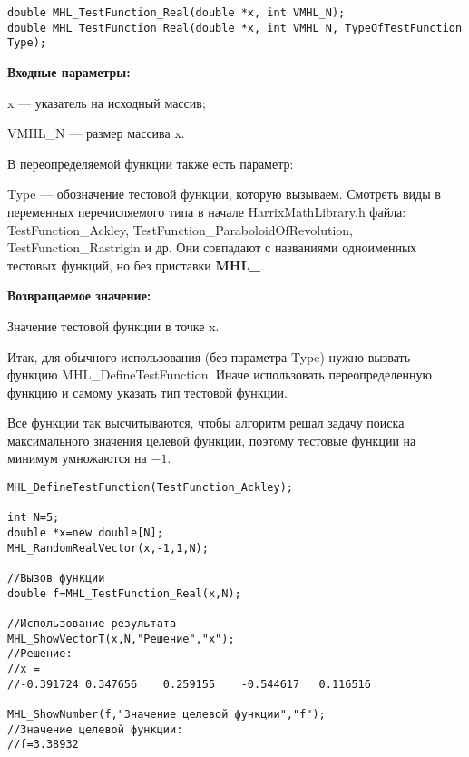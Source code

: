 \documentclass[a4paper,12pt]{article}
\begin{document}
\begin{lstlisting}[label=code_syntax_MHL_TestFunction_Real,caption=Синтаксис]
double MHL_TestFunction_Real(double *x, int VMHL_N);
double MHL_TestFunction_Real(double *x, int VMHL_N, TypeOfTestFunction Type);
\end{lstlisting}

\textbf{Входные параметры:}

x --- указатель на исходный массив;

VMHL\_N --- размер массива x.

В переопределяемой функции также есть параметр:
  
Type --- обозначение тестовой функции, которую вызываем.
Смотреть виды в переменных перечисляемого типа в начале HarrixMathLibrary.h файла: TestFunction\_Ackley, TestFunction\_ParaboloidOfRevolution, TestFunction\_Rastrigin и др. Они совпадают с названиями одноименных тестовых функций, но без приставки \textbf{MHL\_}.

\textbf{Возвращаемое значение:}
 
Значение тестовой функции в точке x.

Итак, для обычного использования (без параметра Type) нужно вызвать функцию MHL\_DefineTestFunction. Иначе использовать переопределенную функцию и самому указать тип тестовой функции.

Все функции так высчитываются, чтобы алгоритм решал задачу поиска максимального значения целевой функции, поэтому тестовые функции на минимум умножаются на $-1$.


\begin{lstlisting}[label=code_use_MHL_TestFunction_Real,caption=Пример использования]
MHL_DefineTestFunction(TestFunction_Ackley);

int N=5;
double *x=new double[N];
MHL_RandomRealVector(x,-1,1,N);

//Вызов функции
double f=MHL_TestFunction_Real(x,N);

//Использование результата
MHL_ShowVectorT(x,N,"Решение","x");
//Решение:
//x =
//-0.391724	0.347656	0.259155	-0.544617	0.116516

MHL_ShowNumber(f,"Значение целевой функции","f");
//Значение целевой функции:
//f=3.38932
\end{lstlisting}
\end{document}
